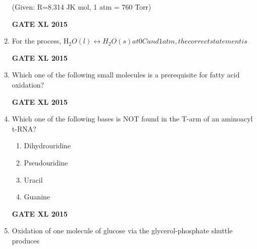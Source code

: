 \documentclass[journal,12pt,onecolumn]{IEEEtran}
\begin{document}
\begin{enumerate}
(Given: R=8.314 JK mol, 1 atm = 760 Torr)
\begin{flushright}\textbf{GATE XL 2015}\end{flushright}
\item For the process, H$_2O(l)\leftrightarrow H_2O(s) at 0 C and 1 atm, the correct statement is$
    \begin{enumerate}
    \end{enumerate}
\begin{flushright}\textbf{GATE XL 2015}\end{flushright}
\item Which one of the following small molecules is a prerequisite for fatty acid oxidation?
    \begin{enumerate}
    \end{enumerate}
\begin{flushright}\textbf{GATE XL 2015}\end{flushright}
\item Which one of the following bases is NOT found in the T-arm of an aminoacyl t-RNA?
    \begin{enumerate}
            \item Dihydrouridine
	    \item Pseudouridine
	    \item Uracil
            \item Guanine
    \end{enumerate}
\begin{flushright}\textbf{GATE XL 2015}\end{flushright}
\item Oxidation of one molecule of glucose via the glycerol-phosphate shuttle produces
    \begin{enumerate}

\end{enumerate}
\end{enumerate}
\end{document}
